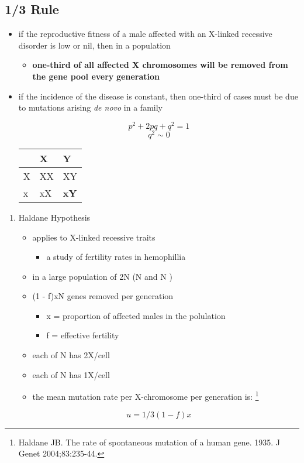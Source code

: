 \documentclass[12pt]{scrartcl}
\begin{document}
\subsection{1/3 Rule}
\label{sec:orge08a140}
\begin{itemize}
\item if the reproductive fitness of a male affected with an X-linked
recessive disorder is low or nil, then in a population
\begin{itemize}
\item \textbf{one-third of all affected X chromosomes will be removed from the gene pool every}
\textbf{generation}
\end{itemize}
\item if the incidence of the disease is constant, then one-third of
cases must be due to mutations arising \emph{de novo} in a family

\[
  p^2 + 2pq + q^2 = 1 
  \]
\[
  q^2 \sim 0
  \]

\begin{center}
\begin{tabular}{lll}
 & X & Y\\
\hline
X & XX & XY\\
\hline
x & xX & \textbf{xY}\\
\end{tabular}
\end{center}
\end{itemize}


\begin{enumerate}
\item Haldane Hypothesis
\label{sec:org92eff16}
\begin{itemize}
\item applies to X-linked recessive traits
\begin{itemize}
\item a study of fertility rates in hemophillia
\end{itemize}

\item in a large population of 2N (N \male and N \female)
\item (1 - f)xN genes removed per generation
\begin{itemize}
\item x = proportion of affected males in the polulation
\item f = effective fertility
\end{itemize}

\item each of N \female has 2X/cell
\item each of N \male{} has 1X/cell
\item the mean mutation rate per X-chromosome per generation is: \footnote{Haldane JB. The rate of spontaneous mutation of a human gene. 1935. J Genet 2004;83:235-44.}
\end{itemize}

\[
 u = 1/3(1 - f)x  
 \]
\end{enumerate}
\end{document}
